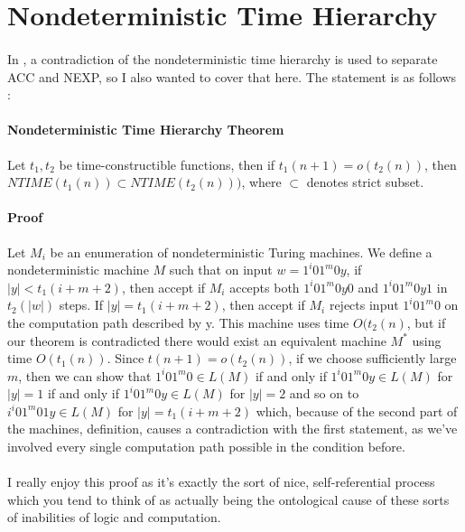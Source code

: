 \documentclass{article}
\begin{document}
\section*{Nondeterministic Time Hierarchy}

\paragraph*{}
  In \cite{Williams2010}, a contradiction of the nondeterministic time hierarchy is used to separate
ACC and NEXP, so I also wanted to cover that here. The statement is as follows \cite{FortnowBlog2}:

\paragraph*{Nondeterministic Time Hierarchy Theorem}
  Let $t_1, t_2$ be time-constructible functions, then if $t_1(n + 1) = o(t_2(n))$, then
$NTIME(t_1(n)) \subset NTIME(t_2(n)))$, where $\subset$ denotes strict subset.

\paragraph*{Proof \cite{FortnowBlog1}}
  Let $M_i$ be an enumeration of nondeterministic Turing machines. We define a nondeterministic
machine $M$ such that on input $w = 1^i01^m0y$, if $|y| < t_1(i+m+2)$, then accept if $M_i$ accepts
both $1^i01^m0y0$ and $1^i01^m0y1$ in $t_2(|w|)$ steps. If $|y| = t_1(i+m+2)$, then accept if
$M_i$ rejects input $1^i01^m0$ on the computation path described by y. This machine uses time 
$O(t_2(n)$, but if our theorem is contradicted there would exist an equivalent machine $M^{*}$
using time $O(t_1(n))$. Since $t(n + 1) = o(t_2(n))$, if we choose sufficiently large $m$, then
we can show that $1^i01^m0 \in L(M)$ if and only if $1^i01^m0y \in L(M)$ for $|y| = 1$ if and
only if $1^i01^m0y \in L(M)$ for $|y| = 2$ and so on to $i^i01^m01y \in L(M)$ for $|y| = t_1(i+m+2)$
which, because of the second part of the machines, definition, causes a contradiction with the
first statement, as we've involved every single computation path possible in the condition before.

\paragraph*{}
  I really enjoy this proof as it's exactly the sort of nice, self-referential process which you
tend to think of as actually being the ontological cause of these sorts of inabilities of logic
and computation. 
  
{}

\end{document}
